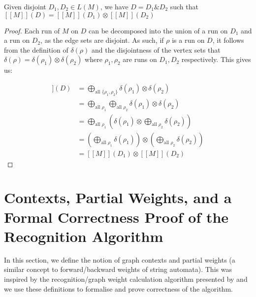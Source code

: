 \documentclass[11pt]{article}
\begin{document}
\begin{observation}
Given disjoint $D_1, D_2 \in L(M)$, we have $D = D_1 \& D_2$ such that $[[M]](D)
= [[M]](D_1) \otimes [[M]](D_2)$
\end{observation}
\begin{proof}
  Each run of $M$ on $D$ can be decomposed into the union of a run on $D_1$ and
  a run on $D_2$, as the edge sets are disjoint. As such, if $\rho$ is a run on
  $D$, it follows from the definition of $\delta(\rho)$ and the disjointness of
  the vertex sets that $\delta(\rho) = \delta(\rho_1) \otimes \delta(\rho_2)$ where
  $\rho_1,\rho_2$ are runs on $D_1,D_2$ respectively. This gives us:

  \begin{align*}
    [[M]](D) &= \bigoplus_{\text{all }\{\rho_1,\rho_2\}} \delta(\rho_1) \otimes \delta(\rho_2)\\
    &= \bigoplus_{\text{all } \rho_1} \bigoplus_{\text{all } \rho_2} \delta(\rho_1) \otimes \delta(\rho_2)\\
    &= \bigoplus_{\text{all } \rho_1} \left(\delta(\rho_1) \otimes \bigoplus_{\text{all } \rho_2} \delta(\rho_2)\right) \\
    & = \left(\bigoplus_{\text{all } \rho_1} \delta(\rho_1)\right) \otimes \left(\bigoplus_{\text{all } \rho_2} \delta(\rho_2)\right) \\
    & = [[M]](D_1) \otimes [[M]](D_2)
  \end{align*}

\end{proof}

\section{Contexts, Partial Weights, and a Formal Correctness Proof of the Recognition Algorithm}
In this section, we define the notion of graph contexts and partial weights (a
similar concept to forward/backward weights of string automata). This was
inspired by the recognition/graph weight calculation algorithm presented by
\cite{chiang2018weighted} and we use these definitions to formalise and prove
correctness of the algorithm. 
\end{document}
